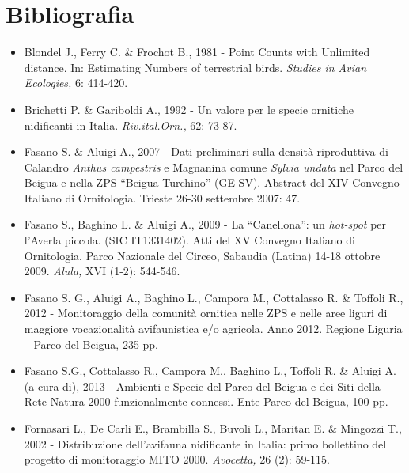 \section*{Bibliografia}
\begin{itemize}\itemsep0pt
	\item Blondel J., Ferry C. \& Frochot B., 1981 - Point Counts with Unlimited
distance. In: Estimating Numbers of terrestrial birds. \textit{Studies
in Avian Ecologies,} 6: 414-420. 

	\item Brichetti P. \& Gariboldi A., 1992 - Un
{\guillemotleft}valore{\guillemotright} per le specie ornitiche
nidificanti in Italia. \textit{Riv.ital.Orn.,} 62: 73-87. 

	\item Fasano S. \& Aluigi A., 2007 - Dati preliminari sulla densit\`a
riproduttiva di Calandro \textit{Anthus campestris }e Magnanina comune
\textit{Sylvia undata}\textit{ }nel Parco del Beigua e nella ZPS
{\textquotedblleft}Beigua-Turchino{\textquotedblright} (GE-SV).
Abstract del XIV Convegno Italiano di Ornitologia. Trieste 26-30
settembre 2007: 47. 

	\item Fasano S., Baghino L. \& Aluigi A., 2009 - La
{\textquotedblleft}Canellona{\textquotedblright}: un \textit{hot-spot}
per l{\textquoteright}Averla piccola. (SIC IT1331402). Atti del XV
Convegno Italiano di Ornitologia. Parco Nazionale del Circeo, Sabaudia
(Latina) 14-18 ottobre 2009. \textit{Alula,} XVI (1-2): 544-546.

	\item Fasano S. G., Aluigi A., Baghino L., Campora M., Cottalasso R. \&
Toffoli R., 2012 - Monitoraggio della comunit\`a ornitica nelle
ZPS e nelle aree liguri di maggiore vocazionalit\`a avifaunistica e/o
agricola. Anno 2012. Regione Liguria -- Parco del Beigua, 235 pp.

	\item Fasano S.G., Cottalasso R., Campora M., Baghino L., Toffoli R. \& Aluigi
A. (a cura di), 2013 - Ambienti e Specie del Parco del Beigua e
dei Siti della Rete Natura 2000 funzionalmente connessi. Ente Parco
del Beigua, 100 pp. 

	\item Fornasari L., De Carli E., Brambilla S., Buvoli L., Maritan E. \&
Mingozzi T., 2002 - Distribuzione dell{\textquoteright}avifauna
nidificante in Italia: primo bollettino del progetto di
monitoraggio MITO 2000. \textit{Avocetta,} 26 (2): 59-115.


\end{itemize}
